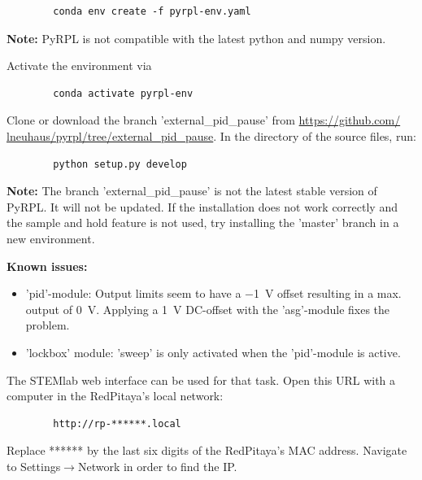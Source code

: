 \documentclass[twoside,a4paper]{refart}
\begin{document}
\begin{tcolorbox}
	\begin{verbatim}
		conda env create -f pyrpl-env.yaml
	\end{verbatim}
\end{tcolorbox}

\textbf{Note:}  PyRPL is not compatible with the latest python and numpy version.

Activate the environment via

\begin{tcolorbox}
	\begin{verbatim}
		conda activate pyrpl-env
	\end{verbatim}
\end{tcolorbox}

Clone or download the branch 'external\_pid\_pause' from \href{https://github.com/lneuhaus/pyrpl/tree/external_pid_pause}{https://github.com/ lneuhaus/pyrpl/tree/external\_pid\_pause}. In the directory of the source files, run:

\begin{tcolorbox}
	\begin{verbatim}
		python setup.py develop
	\end{verbatim}
\end{tcolorbox}

\textbf{Note:} The branch 'external\_pid\_pause' is not the latest stable version of PyRPL. It will not be updated. If the installation does not work correctly and the sample and hold feature is not used, try installing the 'master' branch in a new environment.

\textbf{Known issues:}
\begin{itemize}
	\item 'pid'-module: Output limits seem to have a \SI{-1}{\volt} offset resulting in a max. output of \SI{0}{\volt}. Applying a \SI{1}{\volt} DC-offset with the 'asg'-module fixes the problem.
	\item 'lockbox' module: 'sweep' is only activated when the 'pid'-module is active.
\end{itemize}   

The STEMlab web interface can be used for that task. Open this URL with a computer in the RedPitaya's local network:
\begin{tcolorbox}
	\begin{verbatim}
		http://rp-******.local
	\end{verbatim}
\end{tcolorbox}
Replace ****** by the last six digits of the RedPitaya's MAC address. Navigate to Settings$\rightarrow$Network in order to find the IP.
\end{document}
